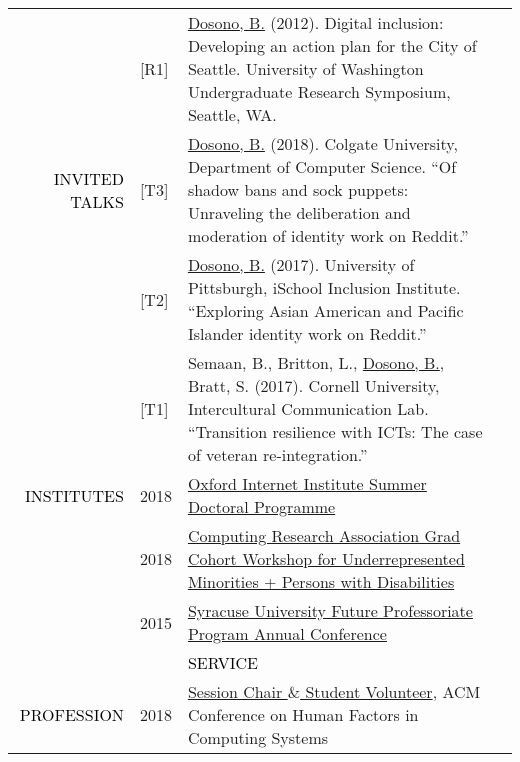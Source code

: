 \documentclass[12pt]{article}
\begin{document}
{{\begin{longtable}{Rp{1.0in}p{0.25in}p{4.75in}}
& \footnotesize{[R1]} & \href{http://youtu.be/Xob0hWqZQgU}{{Dosono, B.}} (2012). Digital inclusion: Developing an action plan for the City of Seattle. University of Washington Undergraduate Research Symposium, Seattle, WA. \\

\textcolor{black}{\footnotesize{\uppercase{Invited Talks}}} & \footnotesize{[T3]} & \href{https://cs.colgate.edu/cs/events/151/}{{Dosono, B.}} (2018). Colgate University, Department of Computer Science. ``Of shadow bans and sock puppets: Unraveling the deliberation and moderation of identity work on Reddit.'' \\

& \footnotesize{[T2]} & \href{http://www.sis.pitt.edu/i3/i3-cohorts/2017/schedule.html}{{Dosono, B.}} (2017). University of Pittsburgh, iSchool Inclusion Institute. ``Exploring Asian American and Pacific Islander identity work on Reddit.'' \\

& \footnotesize{[T1]} & Semaan, B., Britton, L., \href{http://bit.ly/CornellTalk}{{Dosono, B.}}, Bratt, S. (2017). Cornell University, Intercultural Communication Lab. ``Transition resilience with ICTs: The case of veteran re-integration.'' \\

\textcolor{black}{\footnotesize{\uppercase{Institutes}}} & \footnotesize{2018} & \href{https://www.oii.ox.ac.uk/study/summer-doctoral-programme/}{{Oxford Internet Institute Summer Doctoral Programme}} \\

& \footnotesize{2018} & \href{https://cra.org/events/urmgradcohort/}{{Computing Research Association Grad Cohort Workshop for Underrepresented Minorities + Persons with Disabilities}} \\

& \footnotesize{2015} & \href{http://graduateschool.syr.edu/programs/future-professoriate-program/}{{Syracuse University Future Professoriate Program Annual Conference}} \bigskip \\

&&\par \Large \textcolor{black}{\uppercase{Service}}\\ \hhline{~~-}

\textcolor{black}{\footnotesize{\uppercase{Profession}}} & \footnotesize{2018} & \href{https://chi2018.acm.org}{{Session Chair $\&$  Student Volunteer}}, ACM Conference on Human Factors in Computing Systems \\


\end{longtable}}}
\end{document}
